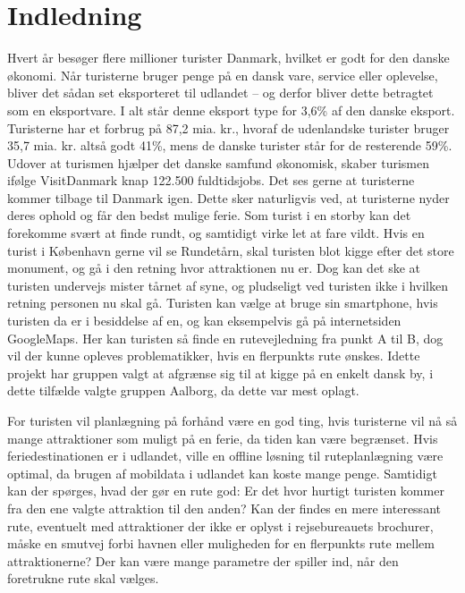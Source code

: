 \chapter{Indledning}

Hvert år besøger flere millioner turister Danmark, hvilket er godt for den danske økonomi. Når turisterne bruger penge på en dansk vare, service eller oplevelse, bliver det sådan set eksporteret til udlandet – og derfor bliver dette betragtet som en eksportvare. I alt står denne eksport type for 3,6\% af den danske eksport. Turisterne har et forbrug på 87,2 mia. kr., hvoraf de udenlandske turister bruger 35,7 mia. kr. altså godt 41\%, mens de danske turister står for de resterende 59\%. Udover at turismen hjælper det danske samfund økonomisk, skaber turismen ifølge VisitDanmark knap 122.500 fuldtidsjobs. \citep{faktaogtalVD}  \newline
Det ses gerne at turisterne kommer tilbage til Danmark igen. Dette sker naturligvis ved, at turisterne nyder deres ophold og får den bedst mulige ferie. Som turist i en storby kan det forekomme svært at finde rundt, og samtidigt virke let at fare vildt. Hvis en turist i København gerne vil se Rundetårn, skal turisten blot kigge efter det store monument, og gå i den retning hvor attraktionen nu er. Dog kan det ske at turisten undervejs mister tårnet af syne, og pludseligt ved turisten ikke i hvilken retning personen nu skal gå. Turisten kan vælge at bruge sin smartphone, hvis turisten da er i besiddelse af en, og kan eksempelvis gå på internetsiden GoogleMaps. Her kan turisten så finde en rutevejledning fra punkt A til B, dog vil der kunne opleves problematikker, hvis en flerpunkts rute ønskes. Idette projekt har gruppen valgt at afgrænse sig til at kigge på en enkelt dansk by, i dette tilfælde valgte gruppen Aalborg, da dette var mest oplagt.  \newline

For turisten vil planlægning på forhånd være en god ting, hvis turisterne vil nå så mange attraktioner som muligt på en ferie, da tiden kan være begrænset\citep{YouthCentral}. Hvis feriedestinationen er i udlandet, ville en offline løsning til ruteplanlægning være optimal, da brugen af mobildata i udlandet kan koste mange penge\citep {TDC}. \newline
Samtidigt kan der spørges, hvad der gør en rute god: Er det hvor hurtigt turisten kommer fra den ene valgte attraktion til den anden? Kan der findes en mere interessant rute, eventuelt med attraktioner der ikke er oplyst i rejsebureauets brochurer, måske en smutvej forbi havnen eller muligheden for en flerpunkts rute mellem attraktionerne? Der kan være mange parametre der spiller ind, når den foretrukne rute skal vælges. \newline

